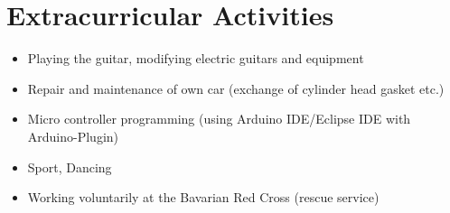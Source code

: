 

\section{Extracurricular Activities}
\begin{itemize}
	\item Playing the guitar, modifying electric guitars and equipment
	\item Repair and maintenance of own car (exchange of cylinder head gasket etc.)
	\item Micro controller programming (using Arduino IDE/Eclipse IDE with Arduino-Plugin)
	\item Sport, Dancing
	\item Working voluntarily at the Bavarian Red Cross (rescue service)
\end{itemize}